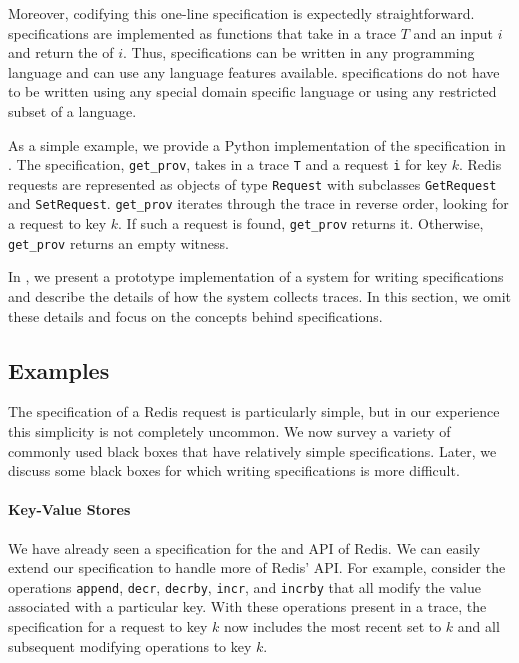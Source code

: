 Moreover, codifying this one-line \watprovenance{} specification is expectedly
straightforward. \Watprovenance{} specifications are implemented as functions
that take in a trace $T$ and an input $i$ and return the \watprovenance{} of
$i$. Thus, \watprovenance{} specifications can be written in any programming
language and can use any language features available.  \Watprovenance{}
specifications do not have to be written using any special domain specific
language or using any restricted subset of a language.

As a simple example, we provide a Python implementation of the
\watprovenance{} specification in .  The specification,
\texttt{get\_prov}, takes in a trace \texttt{T} and a \kvget{} request
\texttt{i} for key $k$. Redis requests are represented as objects of type
\texttt{Request} with subclasses \texttt{GetRequest} and \texttt{SetRequest}.
\texttt{get\_prov} iterates through the trace in reverse order, looking for a
\kvset{} request to key $k$. If such a \kvset{} request is found,
\texttt{get\_prov} returns it. Otherwise, \texttt{get\_prov} returns an empty
witness.

{}

In , we present a prototype implementation of a system for
writing \watprovenance{} specifications and describe the details of how the
system collects traces. In this section, we omit these details and focus on
the concepts behind \watprovenance{} specifications.

\subsection{Examples}
The \watprovenance{} specification of a Redis \kvget{} request is particularly
simple, but in our experience this simplicity is not completely uncommon. We
now survey a variety of commonly used black boxes that have relatively simple
\watprovenance{} specifications. Later, we discuss some black boxes for which
writing \watprovenance{} specifications is more difficult.

\paragraph{Key-Value Stores}
We have already seen a \watprovenance{} specification for the \kvget{} and
\kvset{} API of Redis. We can easily extend our \watprovenance{} specification
to handle more of Redis' API. For example, consider the operations
\texttt{append}, \texttt{decr}, \texttt{decrby}, \texttt{incr}, and
\texttt{incrby} that all modify the value associated with a particular key.
With these operations present in a trace, the \watprovenance{} specification
for a \kvget{} request to key $k$ now includes the most recent set to $k$ and
all subsequent modifying operations to key $k$.

